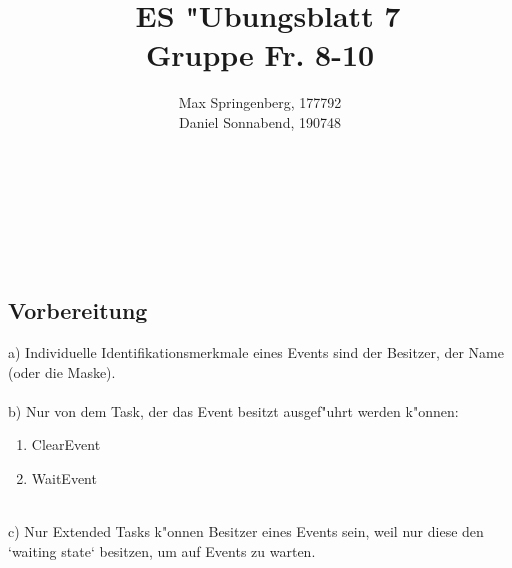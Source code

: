 \documentclass{article}
\author{Max Springenberg, 177792\\
        Daniel Sonnabend, 190748}
\title{\
    ES "Ubungsblatt 7\\
    Gruppe Fr. 8-10
    }
\date{}
\newcommand{\gap}{\ \\ \\}
\begin{document}
\maketitle
\\
\gap
\\
\subsection{Vorbereitung}
a) Individuelle Identifikationsmerkmale eines Events sind der Besitzer, 
    der Name (oder die Maske).\\
\\
b) Nur von dem Task, der das Event besitzt ausgef"uhrt werden k"onnen:\\
\begin{enumerate}
    \item ClearEvent\\
    \item WaitEvent\\
\end{enumerate}
\\
c) Nur Extended Tasks k"onnen Besitzer eines Events sein, weil nur diese
    den `waiting state` besitzen, um auf Events zu warten.\\
\\
\end{document}
